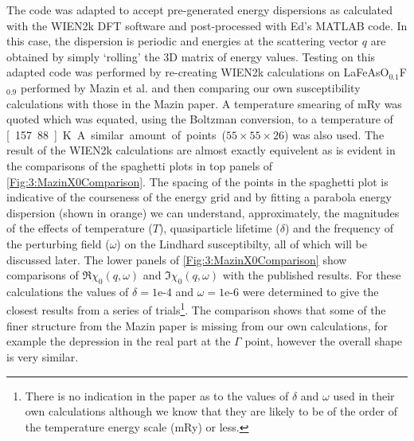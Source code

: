 The code was adapted to accept pre-generated energy dispersions as calculated with the WIEN2k DFT software and post-processed with Ed's MATLAB code. In this case, the dispersion is periodic and energies at the scattering vector $q$ are obtained by simply `rolling' the 3D matrix of energy values. Testing on this adapted code was performed by re-creating WIEN2k calculations on LaFeAsO$_{0.1}$F$_{0.9}$ performed by Mazin et al.\cite{Mazin2008} and then comparing our own susceptibility calculations with those in the Mazin paper. A temperature smearing of \unit[1]{mRy} was quoted which was equated, using the Boltzman conversion, to a temperature of \unit[157.88]{K}. A similar amount of points ($55\times55\times26$) was also used. The result of the WIEN2k calculations are almost exactly equivelent as is evident in the comparisons of the spaghetti plots in top panels of \fig\ref{Fig:3:MazinX0Comparison}. The spacing of the points in the spaghetti plot is indicative of the courseness of the energy grid and by fitting a parabola energy dispersion (shown in orange) we can understand, approximately, the magnitudes of the effects of temperature ($T$), quasiparticle lifetime ($\delta$) and the frequency of the perturbing field ($\omega$) on the Lindhard susceptibilty, all of which will be discussed later. The lower panels of \fig\ref{Fig:3:MazinX0Comparison} show comparisons of $\Re\chi_0(q,\omega)$ and $\Im\chi_0(q,\omega)$ with the published results. For these calculations the values of $\delta=\textrm{1e-4}$ and $\omega=\textrm{1e-6}$ were determined to give the closest results from a series of trials\footnote{There is no indication in the paper as to the values of $\delta$ and $\omega$ used in their own calculations although we know that they are likely to be of the order of the temperature energy scale (\unit[1]{mRy}) or less.}. The comparison shows that some of the finer structure from the Mazin paper is missing from our own calculations, for example the depression in the real part at the $\Gamma$ point, however the overall shape is very similar.

